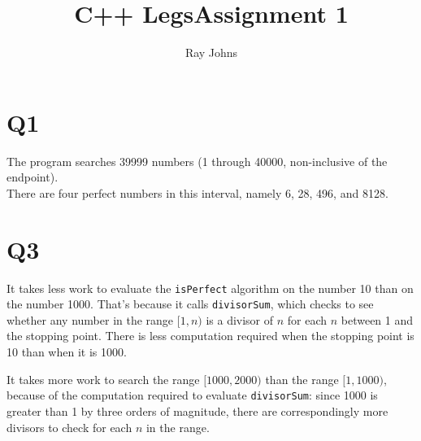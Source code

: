 \documentclass[12pt,a4paper]{article}
\author{Ray Johns}
\title{C++ Legs}
\begin{document}
\title{Assignment 1}
\maketitle

\section{Q1}

The program searches 39999 numbers (1 through 40000, non-inclusive of the endpoint). \\
There are four perfect numbers in this interval, namely 6, 28, 496, and 8128.

\section{Q3}

It takes less work to evaluate the \texttt{isPerfect} algorithm on the number 10 than on the number 1000. That's because it calls \texttt{divisorSum}, which checks to see whether any number in the range $[1, n)$ is a divisor of $n$ for each $n$ between 1 and the stopping point. There is less computation required when the stopping point is 10 than when it is 1000.

It takes more work to search the range $[1000, 2000)$ than the range $[1, 1000)$, because of the computation required to evaluate \texttt{divisorSum}: since 1000 is greater than 1 by three orders of magnitude, there are correspondingly more divisors to check for each $n$ in the range.
\end{document}
